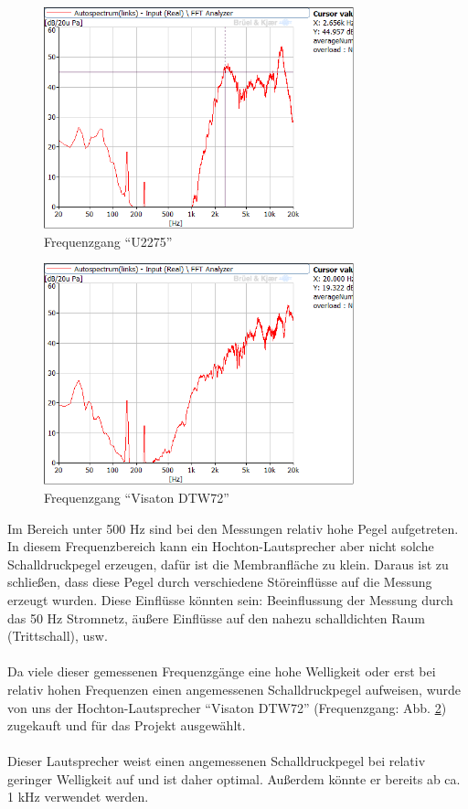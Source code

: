\begin{figure} [H]
	\centering
	\includegraphics[width=0.8\textwidth]{img/LSMessung/HT/U2275_1m_erhoeht.png}
	\caption{Frequenzgang \enquote{U2275}}
	\label{fig:4.3.5}
\end{figure}

\begin{figure} [H]
	\centering
	\includegraphics[width=0.8\textwidth]{img/LSMessung/HT/VisatonDTW72.png}
	\caption{Frequenzgang \enquote{Visaton DTW72}}
	\label{fig:4.3.6}
\end{figure}
\newpage
Im Bereich unter 500 Hz sind bei den Messungen relativ hohe Pegel aufgetreten.
In diesem Frequenzbereich kann ein Hochton-Lautsprecher aber nicht solche Schalldruckpegel erzeugen, dafür ist die Membranfläche zu klein.
Daraus ist zu schließen, dass diese Pegel durch verschiedene Störeinflüsse auf die Messung erzeugt wurden.
Diese Einflüsse könnten sein: Beeinflussung der Messung durch das 50 Hz Stromnetz, äußere Einflüsse auf den nahezu schalldichten Raum (Trittschall), usw.
\\ \\
Da viele dieser gemessenen Frequenzgänge eine hohe Welligkeit oder erst bei relativ hohen Frequenzen einen angemessenen Schalldruckpegel aufweisen, wurde von uns der Hochton-Lautsprecher \enquote{Visaton DTW72} (Frequenzgang: Abb. \ref{fig:4.3.6}) zugekauft und für das Projekt ausgewählt.
\\ \\
Dieser Lautsprecher weist einen angemessenen Schalldruckpegel bei relativ geringer Welligkeit auf und ist daher optimal.
Außerdem könnte er bereits ab ca. 1 kHz verwendet werden.

